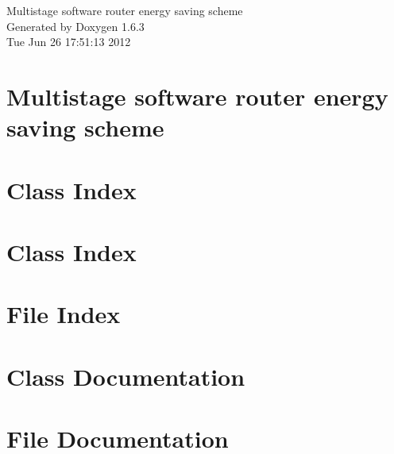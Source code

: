 \documentclass[a4paper]{book}
\begin{document}
\hypersetup{pageanchor=false}
\begin{titlepage}
\vspace*{7cm}
\begin{center}
{\Large Multistage software router energy saving scheme }\\
\vspace*{1cm}
{\large Generated by Doxygen 1.6.3}\\
\vspace*{0.5cm}
{\small Tue Jun 26 17:51:13 2012}\\
\end{center}
\end{titlepage}
\clearemptydoublepage
{}
\tableofcontents
\clearemptydoublepage
{}
\hypersetup{pageanchor=true}
\chapter{Multistage software router energy saving scheme}
\label{index}\hypertarget{index}{}
\chapter{Class Index}

\chapter{Class Index}

\chapter{File Index}

\chapter{Class Documentation}










\chapter{File Documentation}






















\printindex
\end{document}
